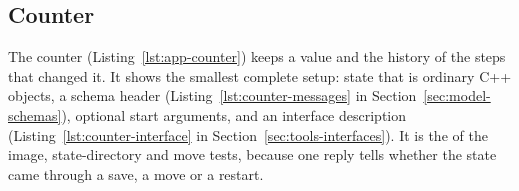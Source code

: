 \subsection{Counter}\label{sec:examples-counter}

The counter (Listing~\ref{lst:app-counter}) keeps a value and the
history of the steps that changed it. It shows the smallest complete
setup: state that is ordinary C++ objects, a schema header
(Listing~\ref{lst:counter-messages} in Section~\ref{sec:model-schemas}),
optional start arguments, and an interface description
(Listing~\ref{lst:counter-interface} in
Section~\ref{sec:tools-interfaces}).
It is the \paglet{} of the image, state-directory and move tests,
because one  reply tells whether the state came through a
save, a move or a restart.

